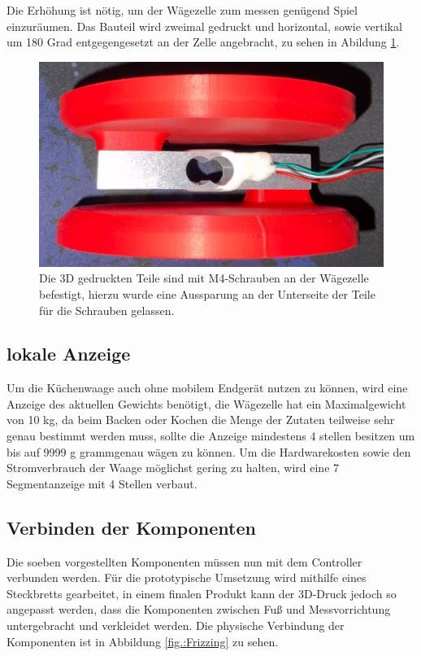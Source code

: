 Die Erhöhung ist nötig, um der Wägezelle zum messen genügend Spiel einzuräumen. Das Bauteil wird zweimal gedruckt und horizontal, sowie vertikal um 180 Grad entgegengesetzt an der Zelle angebracht, zu sehen in Abildung \ref{fig.:System}.

\begin{figure}[hbtp]
	\centering
	\includegraphics[width=1\textwidth]{Bilder/System.png}
	\caption{Die 3D gedruckten Teile sind mit M4-Schrauben an der Wägezelle befestigt, hierzu wurde eine Aussparung an der Unterseite der Teile für die Schrauben gelassen.}
	\label{fig.:System}
\end{figure} 

\subsection{lokale Anzeige}

Um die Küchenwaage auch ohne mobilem Endgerät nutzen zu können, wird eine Anzeige des aktuellen Gewichts benötigt, die Wägezelle hat ein Maximalgewicht von 10 kg, da beim Backen oder Kochen die Menge der Zutaten teilweise sehr genau bestimmt werden muss, sollte die Anzeige mindestens 4 stellen besitzen um bis auf 9999 g grammgenau wägen zu können. Um die Hardwarekosten sowie den Stromverbrauch der Waage möglichst gering zu halten, wird eine 7 Segmentanzeige mit 4 Stellen verbaut.  

\subsection{Verbinden der Komponenten}

Die soeben vorgestellten Komponenten müssen nun mit dem Controller verbunden werden. Für die prototypische Umsetzung wird mithilfe eines Steckbretts gearbeitet, in einem finalen Produkt kann der 3D-Druck jedoch so angepasst werden, dass die Komponenten zwischen Fuß und Messvorrichtung untergebracht und verkleidet werden. Die physische Verbindung der Komponenten ist in Abbildung \ref{fig.:Frizzing} zu sehen.

